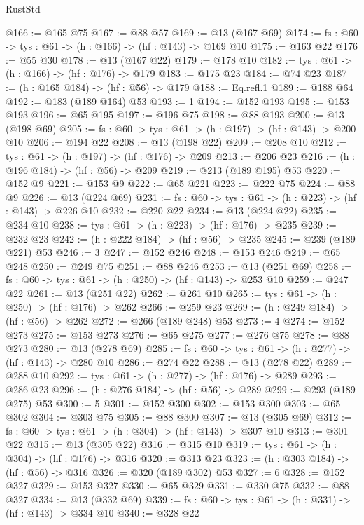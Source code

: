 \begin{lexlean}{RustStd}
\begin{coremodule}
@166 := @165 @75
@167 := @88 @57
@169 := @13 (@167 @69)
@174 := {fs : @60} -> {tys : @61} -> (h : @166) -> (hf : @143) -> @169 @10
@175 := @163 @22
@176 := @55 @30
@178 := @13 (@167 @22)
@179 := @178 @10
@182 := {tys : @61} -> (h : @166) -> (hf : @176) -> @179
@183 := @175 @23
@184 := @74 @23
@187 := (h : @165 @184) -> (hf : @56) -> @179
@188 := Eq.refl.{1}
@189 := @188 @64
@192 := @183 (@189 @164) @53
@193 := 1
@194 := @152 @193
@195 := @153 @193
@196 := @65 @195
@197 := @196 @75
@198 := @88 @193
@200 := @13 (@198 @69)
@205 := {fs : @60} -> {tys : @61} -> (h : @197) -> (hf : @143) -> @200 @10
@206 := @194 @22
@208 := @13 (@198 @22)
@209 := @208 @10
@212 := {tys : @61} -> (h : @197) -> (hf : @176) -> @209
@213 := @206 @23
@216 := (h : @196 @184) -> (hf : @56) -> @209
@219 := @213 (@189 @195) @53
@220 := @152 @9
@221 := @153 @9
@222 := @65 @221
@223 := @222 @75
@224 := @88 @9
@226 := @13 (@224 @69)
@231 := {fs : @60} -> {tys : @61} -> (h : @223) -> (hf : @143) -> @226 @10
@232 := @220 @22
@234 := @13 (@224 @22)
@235 := @234 @10
@238 := {tys : @61} -> (h : @223) -> (hf : @176) -> @235
@239 := @232 @23
@242 := (h : @222 @184) -> (hf : @56) -> @235
@245 := @239 (@189 @221) @53
@246 := 3
@247 := @152 @246
@248 := @153 @246
@249 := @65 @248
@250 := @249 @75
@251 := @88 @246
@253 := @13 (@251 @69)
@258 := {fs : @60} -> {tys : @61} -> (h : @250) -> (hf : @143) -> @253 @10
@259 := @247 @22
@261 := @13 (@251 @22)
@262 := @261 @10
@265 := {tys : @61} -> (h : @250) -> (hf : @176) -> @262
@266 := @259 @23
@269 := (h : @249 @184) -> (hf : @56) -> @262
@272 := @266 (@189 @248) @53
@273 := 4
@274 := @152 @273
@275 := @153 @273
@276 := @65 @275
@277 := @276 @75
@278 := @88 @273
@280 := @13 (@278 @69)
@285 := {fs : @60} -> {tys : @61} -> (h : @277) -> (hf : @143) -> @280 @10
@286 := @274 @22
@288 := @13 (@278 @22)
@289 := @288 @10
@292 := {tys : @61} -> (h : @277) -> (hf : @176) -> @289
@293 := @286 @23
@296 := (h : @276 @184) -> (hf : @56) -> @289
@299 := @293 (@189 @275) @53
@300 := 5
@301 := @152 @300
@302 := @153 @300
@303 := @65 @302
@304 := @303 @75
@305 := @88 @300
@307 := @13 (@305 @69)
@312 := {fs : @60} -> {tys : @61} -> (h : @304) -> (hf : @143) -> @307 @10
@313 := @301 @22
@315 := @13 (@305 @22)
@316 := @315 @10
@319 := {tys : @61} -> (h : @304) -> (hf : @176) -> @316
@320 := @313 @23
@323 := (h : @303 @184) -> (hf : @56) -> @316
@326 := @320 (@189 @302) @53
@327 := 6
@328 := @152 @327
@329 := @153 @327
@330 := @65 @329
@331 := @330 @75
@332 := @88 @327
@334 := @13 (@332 @69)
@339 := {fs : @60} -> {tys : @61} -> (h : @331) -> (hf : @143) -> @334 @10
@340 := @328 @22

\end{coremodule}
\end{lexlean}
